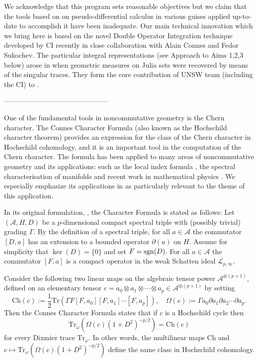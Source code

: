 \documentclass{article}
\begin{document}
We acknowledge that this program sets reasonable objectives but we claim that the tools based on on pseudo-differential calculus in various guises applied up-to-date to accomplish it have been inadequate. Our main technical innovation which we bring here  is based on the novel Double Operator Integration technique developed by CI recently in close collaboration with Alain Connes and Fedor Sukochev. The particular integral representations (see Approach to Aims 1,2,3 below) arose in \cite{Connes_team} when geometric measures on Julia sets were recovered by means of the singular traces. They form the core contribution of UNSW team (including the CI) to \cite{Connes_team}.



---------------------------------------------


One of the fundamental tools in noncommutative geometry is the Chern character. The Connes Character Formula (also known as the Hochschild character theorem) provides an expression for the class of the Chern character in Hochschild cohomology, and it is an important    tool in the computation of the Chern character. The formula has been applied to many areas     of noncommutative geometry and its applications: such as the local index formula \cite{ConnesMoscovici}, the spectral characterisation of manifolds \cite{Connes-reconstruction} and recent work in mathematical physics \cite{Connes-Chamseddine-Mukhanov-quanta-of-geometry-2015}. We especially emphasize its applications in \cite{Connes-reconstruction} as particularly relevant to the theme of this application.

In its original formulation, \cite{Connes-original-spectral-1995}, the Character Formula is stated as follows: Let $(\mathcal{A},H,D)$ be a $p$-dimensional compact spectral triple     with (possibly trivial) grading $\Gamma.$ By the definition of a spectral triple, for all $a \in \mathcal{A}$ the commutator $[D,a]$ has an extension to a bounded operator $\partial(a)$ on $H.$ Assume for simplicity that $\ker(D)=\{0\}$ and set $F={\rm sgn}(D).$ For all $a \in \mathcal{A}$ the commutator $[F,a]$ is a compact operator in the weak Schatten ideal $\mathcal{L}_{p,\infty}.$ 

Consider the following two linear maps on the algebraic tensor power $\mathcal{A}^{\otimes(p+1)},$ defined on an elementary tensor $c = a_0\otimes a_1\otimes \cdots \otimes a_p \in \mathcal{A}^{\otimes(p+1)}$ by setting
$$\mathrm{Ch}(c) := \frac{1}{2}\mathrm{Tr}(\Gamma F[F,a_0][F,a_1]\cdots[F,a_p]),\quad \Omega(c) := \Gamma a_0\partial a_1\partial a_2\cdots \partial a_p.$$
Then the Connes Character Formula states that if $c$ is a Hochschild cycle then
\begin{equation*}
\mathrm{Tr}_\omega(\Omega(c)(1+D^2)^{-p/2}) = \mathrm{Ch}(c)
\end{equation*}
for every Dixmier trace $\mathrm{Tr}_\omega$. In other words, the multilinear maps $\mathrm{Ch}$ and $c \mapsto \mathrm{Tr}_\omega(\Omega(c)(1+D^2)^{-p/2})$ define the same class in Hochschild cohomology.
    
\end{document}
